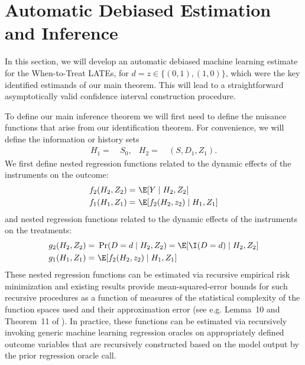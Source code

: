 \section{Automatic Debiased Estimation and Inference}\label{sec:dml}

In this section, we will develop an automatic debiased machine learning estimate for the When-to-Treat LATEs, for $d=z\in \{(0,1), (1,0)\}$, which were the key identified estimands of our main theorem. This will lead to a straightforward asymptotically valid confidence interval construction procedure.

To define our main inference theorem we will first need to define the nuisance functions that arise from our identification theorem. For convenience, we will define the information or history sets 
\begin{align*}
    H_1=~& S_0, & H_2=~& (S, D_1, Z_1).
\end{align*}
We first define nested regression functions related to the dynamic effects of the instruments on the outcome:
\begin{equation}\label{eqn:outcome-nested}
\begin{aligned}
    f_2(H_2, Z_2) =~& \E[Y\mid H_2, Z_2]\\
    f_1(H_1, Z_1) =~& \E[f_2(H_2, z_2)\mid H_1, Z_1]
\end{aligned}
\end{equation}
and nested regression functions related to the dynamic effects of the instruments on the treatments:
\begin{equation}\label{eqn:treatment-nested}
\begin{aligned}
    g_2(H_2, Z_2) =~& \Pr(D=d\mid H_2, Z_2) = \E[\I(D=d)\mid H_2, Z_2]\\
    g_1(H_1, Z_1) =~& \E[f_2(H_2, z_2)\mid H_1, Z_1]
\end{aligned}
\end{equation}
These nested regression functions can be estimated via recursive empirical risk minimization and existing results provide mean-squared-error bounds for such recursive procedures as a function of measures of the statistical complexity of the function spaces used and their approximation error (see e.g. Lemma~10 and Theorem~11 of \cite{lewis2020double}). In practice, these functions can be estimated via recursively invoking generic machine learning regression oracles on appropriately defined outcome variables that are recursively constructed based on the model output by the prior regression oracle call.

